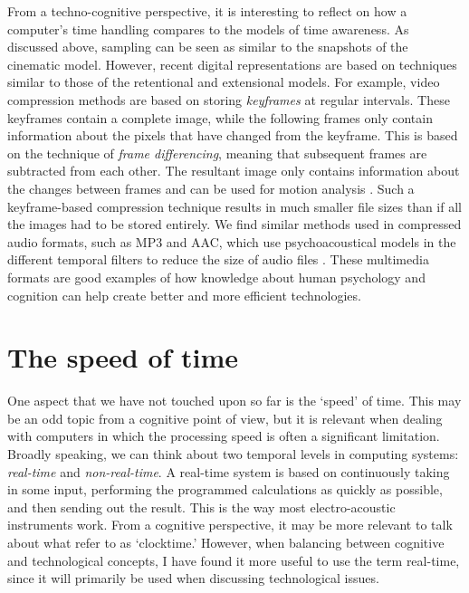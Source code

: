 From a techno-cognitive perspective, it is interesting to reflect on how a computer's time handling compares to the models of time awareness. As discussed above, sampling can be seen as similar to the snapshots of the cinematic model. However, recent digital representations are based on techniques similar to those of the retentional and extensional models. For example, video compression methods are based on storing \emph{keyframes} at regular intervals. These keyframes contain a complete image, while the following frames only contain information about the pixels that have changed from the keyframe. This is based on the technique of \emph{frame differencing}, meaning that subsequent frames are subtracted from each other. The resultant image only contains information about the changes between frames and can be used for motion analysis \citep{jensenius_methods_2018}. Such a keyframe-based compression technique results in much smaller file sizes than if all the images had to be stored entirely. We find similar methods used in compressed audio formats, such as MP3 and AAC, which use psychoacoustical models in the different temporal filters to reduce the size of audio files \citep{brandenburg_mp3_1999}. These multimedia formats are good examples of how knowledge about human psychology and cognition can help create better and more efficient technologies.


\section{The speed of time}\label{sec:time}

One aspect that we have not touched upon so far is the `speed' of time. This may be an odd topic from a cognitive point of view, but it is relevant when dealing with computers in which the processing speed is often a significant limitation. Broadly speaking, we can think about two temporal levels in computing systems: \emph{real-time} and \emph{non-real-time}. A real-time system is based on continuously taking in some input, performing the programmed calculations as quickly as possible, and then sending out the result. This is the way most electro-acoustic instruments work. From a cognitive perspective, it may be more relevant to talk about what \citet{wollner_slow_2018} refer to as `clocktime.' However, when balancing between cognitive and technological concepts, I have found it more useful to use the term real-time, since it will primarily be used when discussing technological issues.


